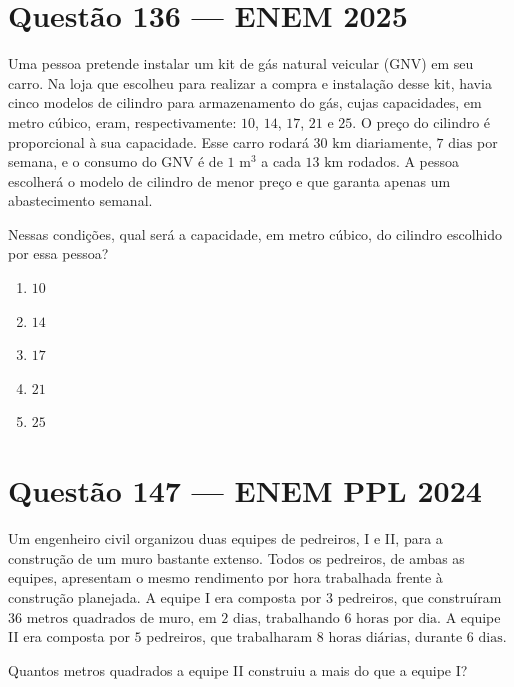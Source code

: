 \documentclass[11pt,a4paper]{article}
\begin{document}

\section*{Questão 136 --- ENEM 2025}

Uma pessoa pretende instalar um kit de gás natural veicular (GNV) em seu carro. Na loja que escolheu para realizar a compra e instalação desse kit, havia cinco modelos de cilindro para armazenamento do gás, cujas capacidades, em metro cúbico, eram, respectivamente: $10$, $14$, $17$, $21$ e $25$. O preço do cilindro é proporcional à sua capacidade. Esse carro rodará $30\text{ km}$ diariamente, $7\text{ dias}$ por semana, e o consumo do GNV é de $1\text{ m}^3$ a cada $13\text{ km}$ rodados. A pessoa escolherá o modelo de cilindro de menor preço e que garanta apenas um abastecimento semanal.

Nessas condições, qual será a capacidade, em metro cúbico, do cilindro escolhido por essa pessoa?

\begin{enumerate}[label=(\Alph*)]
    \item $10$
    \item $14$
    \item $17$
    \item $21$
    \item $25$
\end{enumerate}

\section*{Questão 147 --- ENEM PPL 2024}

Um engenheiro civil organizou duas equipes de pedreiros, I e II, para a construção de um muro bastante extenso. Todos os pedreiros, de ambas as equipes, apresentam o mesmo rendimento por hora trabalhada frente à construção planejada. A equipe I era composta por $3$ pedreiros, que construíram $36\text{ metros quadrados}$ de muro, em $2\text{ dias}$, trabalhando $6\text{ horas por dia}$. A equipe II era composta por $5$ pedreiros, que trabalharam $8\text{ horas diárias}$, durante $6\text{ dias}$.

Quantos metros quadrados a equipe II construiu a mais do que a equipe I?
\end{document}

